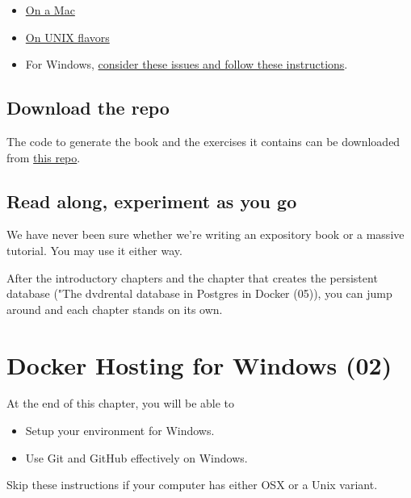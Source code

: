 \documentclass[]{book}
\providecommand{\tightlist}{%
  \setlength{\itemsep}{0pt}\setlength{\parskip}{0pt}}
\theoremstyle{definition}
\theoremstyle{definition}
\theoremstyle{definition}
\theoremstyle{remark}
\begin{document}
\begin{itemize}
\tightlist
\item
  \href{https://docs.docker.com/docker-for-mac/install/}{On a Mac}
\item
  \href{https://docs.docker.com/install/\#supported-platforms}{On UNIX
  flavors}
\item
  For Windows,
  \href{https://smithjd.github.io/sql-pet/docker-hosting-for-windows.html}{consider
  these issues and follow these instructions}.
\end{itemize}

\hypertarget{download-the-repo}{%
\section{Download the repo}\label{download-the-repo}}

The code to generate the book and the exercises it contains can be
downloaded from \href{https://github.com/smithjd/sql-pet}{this repo}.

\hypertarget{read-along-experiment-as-you-go}{%
\section{Read along, experiment as you
go}\label{read-along-experiment-as-you-go}}

We have never been sure whether we're writing an expository book or a
massive tutorial. You may use it either way.

After the introductory chapters and the chapter that creates the
persistent database ("The dvdrental database in Postgres in Docker
(05)), you can jump around and each chapter stands on its own.

\hypertarget{docker-hosting-for-windows-02}{%
\chapter{Docker Hosting for Windows
(02)}\label{docker-hosting-for-windows-02}}

At the end of this chapter, you will be able to

\begin{itemize}
\tightlist
\item
  Setup your environment for Windows.
\item
  Use Git and GitHub effectively on Windows.
\end{itemize}

Skip these instructions if your computer has either OSX or a Unix
variant.
\end{document}
